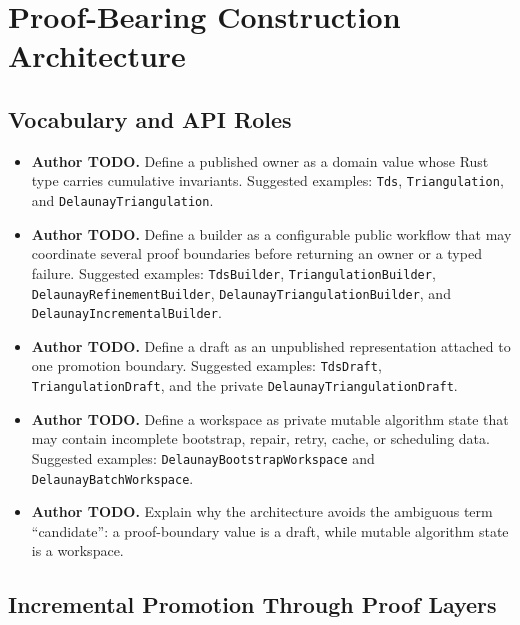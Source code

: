 \documentclass[manuscript,nonacm]{acmart}
\newcommand{\AuthorTodo}[1]{\textbf{Author TODO.} #1}
\begin{document}
\section{Proof-Bearing Construction Architecture}

\subsection{Vocabulary and API Roles}

\begin{itemize}
    \raggedright
  \item \AuthorTodo{Define a published owner as a domain value whose Rust type
      carries cumulative invariants. Suggested examples: \texttt{Tds},
    \texttt{Triangulation}, and \texttt{DelaunayTriangulation}.}
  \item \AuthorTodo{Define a builder as a configurable public workflow that
      may coordinate several proof boundaries before returning an owner or a
      typed failure. Suggested examples: \texttt{TdsBuilder},
      \texttt{TriangulationBuilder}, \texttt{DelaunayRefinementBuilder},
      \texttt{DelaunayTriangulation}\hspace{0pt}\texttt{Builder}, and
    \texttt{DelaunayIncremental}\hspace{0pt}\texttt{Builder}.}
  \item \AuthorTodo{Define a draft as an unpublished representation attached
      to one promotion boundary. Suggested examples: \texttt{TdsDraft},
      \texttt{TriangulationDraft}, and the private
    \texttt{DelaunayTriangulation}\hspace{0pt}\texttt{Draft}.}
  \item \AuthorTodo{Define a workspace as private mutable algorithm state that
      may contain incomplete bootstrap, repair, retry, cache, or
      scheduling data.
      Suggested examples:
      \texttt{DelaunayBootstrap}\hspace{0pt}\texttt{Workspace} and
    \texttt{DelaunayBatch}\hspace{0pt}\texttt{Workspace}.}
  \item \AuthorTodo{Explain why the architecture avoids the ambiguous term
      ``candidate'': a proof-boundary value is a draft, while mutable algorithm
    state is a workspace.}
\end{itemize}

\subsection{Incremental Promotion Through Proof Layers}
\end{document}
